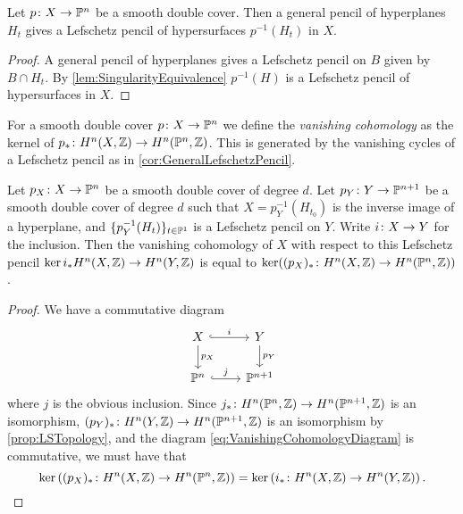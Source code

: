 \begin{corollary}
	\label{cor:GeneralLefschetzPencil}
  Let $p \colon X \to \mathbb{P}^n$ be a smooth double cover. Then a general pencil of hyperplanes $H_t$ gives a Lefschetz pencil  of hypersurfaces $p^{-1}(H_t)$ in $X$.
\end{corollary}
\begin{proof}
  A general pencil of hyperplanes gives a Lefschetz pencil on $B$ given by $B \cap H_t$. By \cref{lem:SingularityEquivalence} $p^{-1}(H)$ is a Lefschetz pencil of hypersurfaces in $X$.
\end{proof}
For a smooth double cover $p \colon X \to \mathbb{P}^n$ we define the \emph{vanishing cohomology} as the kernel of $p_* \colon H^n(X,\mathbb{Z}) \to H^n(\mathbb{P}^n,\mathbb{Z})$. This is generated by the vanishing cycles of a Lefschetz pencil as in \cref{cor:GeneralLefschetzPencil}. 
\begin{lemma}
	\label{lem:VanishingCommutes}
	Let $p_X \colon X \to \mathbb{P}^n$ be a smooth double cover of degree $d$.
	Let $p_Y \colon Y \to \mathbb{P}^{n+1}$ be a smooth double cover of degree $d$ such
	that $X = p_Y^{-1}(H_{t_0})$ is the inverse image of a hyperplane, and $\lbrace p^{-1}_Y(H_t)\rbrace_{t \in \mathbb{P}^1}$ is a Lefschetz pencil on $Y$. Write $i \colon X \to Y$ for the inclusion. Then the vanishing cohomology of $X$
	with respect to this Lefschetz pencil \ie $\ker i_* H^n(X,\mathbb{Z}) \to H^n(Y,\mathbb{Z})$ is equal to
	$\ker((p_X)_* \colon H^n(X,\mathbb{Z}) \to H^n(\mathbb{P}^n,\mathbb{Z}))$.
\end{lemma}
\begin{proof}
	We have a commutative diagram
	\begin{equation}
		\label{eq:VanishingCohomologyDiagram}
		\begin{tikzcd}
			X \arrow[hook,r,"i"] \arrow[d,"p_X"]& Y \arrow[d,"p_Y"] \\
			\P^n \arrow[hook,r,"j"]& \P^{n+1}
		\end{tikzcd}
	\end{equation}
	where $j$ is the obvious inclusion.
	Since  $j_* \colon H^n(\mathbb{P}^n,\mathbb{Z}) \to H^n(\mathbb{P}^{n+1},\mathbb{Z})$ is an isomorphism, $(p_Y)_* \colon H^n(Y,\mathbb{Z}) \to H^n(\mathbb{P}^{n+1},\mathbb{Z})$ is an isomorphism by \cref{prop:LSTopology}, and the diagram \eqref{eq:VanishingCohomologyDiagram} is commutative,
we must have that 
	\begin{equation*}
		\ker\left((p_X)_* \colon H^n(X,\mathbb{Z}) \to H^n(\mathbb{P}^n,\mathbb{Z})\right) = \ker\left(i_* \colon H^n(X,\mathbb{Z}) \to H^n(Y,\mathbb{Z})\right).
	\end{equation*}
\end{proof}

